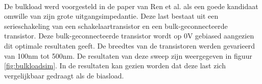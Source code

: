 \paragraph{}
De bulkload werd voorgesteld in de paper van Ren et al. \cite{bulkload} als een goede kandidaat omwille van zijn grote uitgangsimpedantie. Deze last bestaat uit een serieschakeling van een schakelaartransistor en een bulk-geconnecteerde transistor. Deze bulk-geconnecteerde transistor wordt op 0V gebiased aangezien dit optimale resultaten geeft. De breedtes van de transistoren werden gevarieerd van 100nm tot 500nm. De resultaten van deze sweep zijn weergegeven in figuur \ref{fig:bulkloadsim}. In de resultaten kan gezien worden dat deze last zich vergelijkbaar gedraagt als de biasload.

